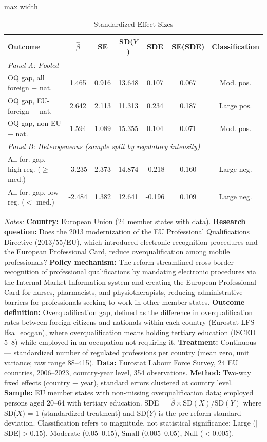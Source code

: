\begin{table}[t]
\centering
\caption{Standardized Effect Sizes}
\label{tab:sde}
\begin{adjustbox}{max width=\textwidth}
\small
\begin{tabular}{lcccccc}
\toprule
Outcome & $\hat{\beta}$ & SE & SD($Y$) & SDE & SE(SDE) & Classification \\
\midrule
\multicolumn{7}{l}{\textit{Panel A: Pooled}} \\
OQ gap, all foreign $-$ nat. & 1.465 & 0.916 & 13.648 & 0.107 & 0.067 & Mod. pos. \\
OQ gap, EU-foreign $-$ nat. & 2.642 & 2.113 & 11.313 & 0.234 & 0.187 & Large pos. \\
OQ gap, non-EU $-$ nat. & 1.594 & 1.089 & 15.355 & 0.104 & 0.071 & Mod. pos. \\
\midrule
\multicolumn{7}{l}{\textit{Panel B: Heterogeneous (sample split by regulatory intensity)}} \\
All-for. gap, high reg. ($\geq$ med.) & -3.235 & 2.373 & 14.874 & -0.218 & 0.160 & Large neg. \\
All-for. gap, low reg. ($<$ med.) & -2.484 & 1.382 & 12.641 & -0.196 & 0.109 & Large neg. \\
\bottomrule
\end{tabular}
\end{adjustbox}
\vspace{0.5em}
\parbox{\textwidth}{\footnotesize\sloppy \textit{Notes:} \textbf{Country:} European Union (24 member states with data). \textbf{Research question:} Does the 2013 modernization of the EU Professional Qualifications Directive (2013/55/EU), which introduced electronic recognition procedures and the European Professional Card, reduce overqualification among mobile professionals? \textbf{Policy mechanism:} The reform streamlined cross-border recognition of professional qualifications by mandating electronic procedures via the Internal Market Information system and creating the European Professional Card for nurses, pharmacists, and physiotherapists, reducing administrative barriers for professionals seeking to work in other member states. \textbf{Outcome definition:} Overqualification gap, defined as the difference in overqualification rates between foreign citizens and nationals within each country (Eurostat LFS lfsa\_eoqgan), where overqualification means holding tertiary education (ISCED 5--8) while employed in an occupation not requiring it. \textbf{Treatment:} Continuous --- standardized number of regulated professions per country (mean zero, unit variance; raw range 88--415). \textbf{Data:} Eurostat Labour Force Survey, 24 EU countries, 2006--2023, country-year level, 354 observations. \textbf{Method:} Two-way fixed effects (country + year), standard errors clustered at country level. \textbf{Sample:} EU member states with non-missing overqualification data; employed persons aged 20--64 with tertiary education. SDE $= \hat{\beta} \times \text{SD}(X) / \text{SD}(Y)$ where SD($X$) = 1 (standardized treatment) and SD($Y$) is the pre-reform standard deviation. Classification refers to magnitude, not statistical significance: Large ($|$SDE$| > 0.15$), Moderate ($0.05$--$0.15$), Small ($0.005$--$0.05$), Null ($< 0.005$).
}
\end{table}
